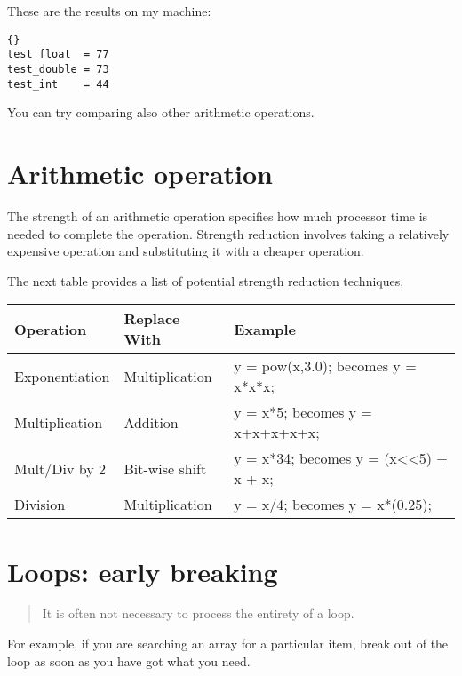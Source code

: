 \documentclass{report}
\begin{document}


These are the results on my machine:
\begin{lstlisting}{}
test_float  = 77
test_double = 73
test_int    = 44
\end{lstlisting}

You can try comparing also other arithmetic operations.

\section{Arithmetic operation}
The strength of an arithmetic operation specifies how much processor time is needed to complete the operation. Strength reduction involves taking a relatively expensive operation and substituting it with a cheaper operation.

The next table provides a list of potential strength reduction techniques.
\newline

\begin{tabular}{|l|l|l|}
\hline
Operation               & Replace With      & Example\\
\hline
Exponentiation          & Multiplication    & y = pow(x,3.0);  becomes  y = x*x*x;\\
\hline
Multiplication          & Addition          & y = x*5;  becomes  y = x+x+x+x+x;\\
\hline 
Mult/Div by 2           & Bit-wise shift    & y = x*34;  becomes  y = (x<<5) + x + x;\\
\hline
Division                & Multiplication    & y = x/4;  becomes  y = x*(0.25);\\
\hline
\end{tabular}


\section{Loops: early breaking}
\begin{quote}
It is often not necessary to process the entirety of a loop.
\end{quote}
For example, if you are searching an array for a particular item, break out of the loop as soon as you have got what you need.
\end{document}
